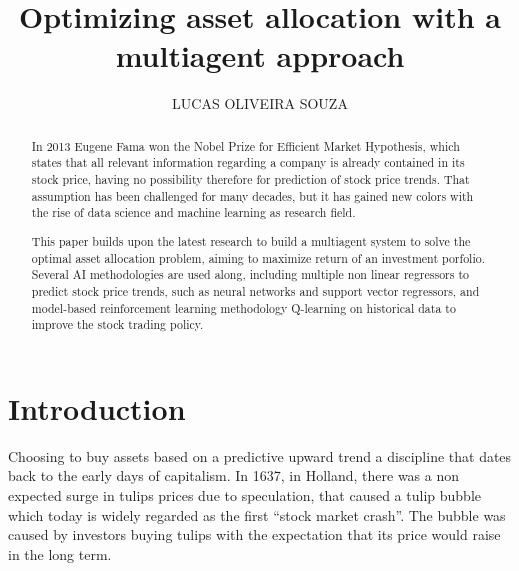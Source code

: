 \documentclass[prodmode,acmtecs]{acmsmall} %
\begin{document}
	
\title{Optimizing asset allocation with a multiagent approach}
\author{LUCAS OLIVEIRA SOUZA
}


\begin{abstract}

	In 2013 Eugene Fama won the Nobel Prize for Efficient Market Hypothesis, which states that all relevant information regarding a company is already contained in its stock price, having no possibility therefore for prediction of stock price trends. That assumption has been challenged for many decades, but it has gained new colors with the rise of data science and machine learning as research field.
	
	This paper builds upon the latest research to build a multiagent system to solve the optimal asset allocation problem, aiming to maximize return of an investment porfolio. Several AI methodologies are used along, including multiple non linear regressors to predict stock price trends, such as neural networks and support vector regressors, and model-based reinforcement learning methodology Q-learning on historical data to improve the stock trading policy.

\end{abstract}

	


\maketitle

\section{Introduction}

Choosing to buy assets based on a predictive upward trend a discipline that dates back to the early days of capitalism. In 1637, in Holland, there was a non expected surge in tulips prices due to speculation, that caused a tulip bubble which today is widely regarded as the first “stock market crash”. The bubble was caused by investors buying tulips with the expectation that its price would raise in the long term. 
\end{document}
